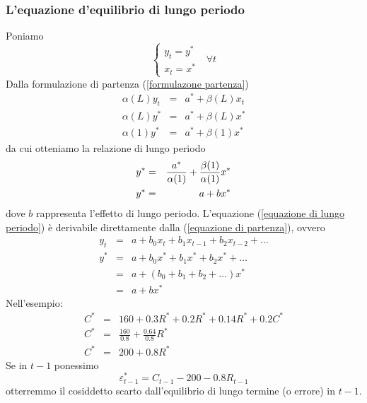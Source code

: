 \documentclass[a4paper]{report}
\newcounter{ese}
\theoremstyle{remark}
\begin{document}
\subsubsection{L'equazione d'equilibrio di lungo periodo}

Poniamo 
\begin{equation*}
\left\{ 
\begin{array}{c}
y_{t}=y^{\ast } \\ 
x_{t}=x^{\ast }%
\end{array}%
\right. \ \ \ \forall t
\end{equation*}%
Dalla formulazione di partenza (\ref{formulazone partenza})%
\begin{eqnarray*}
\alpha (L)y_{t} &=&a^{\ast }+\beta (L)x_{t} \\
\alpha (L)y^{\ast } &=&a^{\ast }+\beta (L)x^{\ast } \\
\alpha (1)y^{\ast } &=&a^{\ast }+\beta (1)x^{\ast }
\end{eqnarray*}%
da cui otteniamo la relazione di lungo periodo%
\begin{eqnarray}
y^{\ast } &=&\frac{a^{\ast }}{\alpha (1)}+\frac{\beta (1)}{\alpha (1)}%
x^{\ast }  \notag \\
y^{\ast } &=&a+bx^{\ast }  \label{equazione di lungo periodo}
\end{eqnarray}%
dove $b$ rappresenta l'effetto di lungo periodo. L'equazione (\ref{equazione
di lungo periodo}) \`{e} derivabile direttamente dalla (\ref{equazione di
partenza}), ovvero%
\begin{eqnarray*}
y_{t} &=&a+b_{0}x_{t}+b_{1}x_{t-1}+b_{2}x_{t-2}+\ldots \\
y^{\ast } &=&a+b_{0}x^{\ast }+b_{1}x^{\ast }+b_{2}x^{\ast }+\ldots \\
&=&a+(b_{0}+b_{1}+b_{2}+\ldots )x^{\ast } \\
&=&a+bx^{\ast }
\end{eqnarray*}%
Nell'esempio:%
\begin{eqnarray*}
C^{\ast } &=&160+0.3R^{\ast }+0.2R^{\ast }+0.14R^{\ast }+0.2C^{\ast } \\
C^{\ast } &=&\frac{160}{0.8}+\frac{0.64}{0.8}R^{\ast } \\
C^{\ast } &=&200+0.8R^{\ast }
\end{eqnarray*}%
Se in $t-1$ ponessimo%
\begin{equation}
\varepsilon _{t-1}^{\ast }=C_{t-1}-200-0.8R_{t-1}
\label{scarto dall equilibrio}
\end{equation}%
otterremmo il cosiddetto scarto dall'equilibrio di lungo termine (o errore)
in $t-1$.
\end{document}
